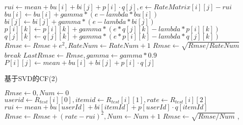 \documentclass[bachelor]{seuthesis} %
\begin{document}
\begin{Main}
\begin{algorithm}
\begin{algorithmic}[1]
                    \State $rui\gets mean+bu[i]+bi[j]+p[i]\cdot q[j],e\gets RateMatrix[i][j]-rui$
                    \State $bu[i]\gets bu[i]+gamma*(e-lambda*bu[i])$
                    \State $bi[j]\gets bi[j]+gamma*(e-lambda*bi[j])$
                        \State $p[i][k]\gets p[i][k]+gamma*(e*q[j][k]-lambda*p[i][k])$
                        \State $q[j][k]\gets q[j][k]+gamma*(e*p[i][k]-lambda*q[j][k])$
                    \EndFor
                    \State $Rmse\gets Rmse+e^2,RateNum\gets RateNum+1$
                \EndFor
            \EndFor
            \State $Rmse\gets\sqrt{Rmse/RateNum}$
                \State $break$
            \EndIf
            \State $LastRmse\gets Rmse,gamma\gets gamma*0.9$
        \EndFor
                    \State $P[i][j]\gets mean+bu[i]+bi[j]+p[i]\cdot q[j]$
                \EndFor
        \EndFor
        \State {}
        \EndFunction
    \end{algorithmic}
\end{algorithm}
\newpage
\begin{algorithm}
    \caption{基于SVD的CF(2)}
    \begin{algorithmic}[1] %
        \State $Rmse\gets0,Num\gets0$
            \State $userid\gets R_{test}[i][0],itemid\gets R_{test}[i][1],rate\gets R_{test}[i][2]$
            \State $rui\gets mean+bu[userId]+bi[itemId]+p[userId]\cdot q[itemId]$
            \State $Rmse\gets Rmse+(rate-rui)^2,Num\gets Num+1$
        \EndFor
        \State $Rmse\gets\sqrt{Rmse/Num}$
        \State {}
        \EndFunction
        \State {}
        \State {},
        \EndFunction
    \end{algorithmic}
\end{algorithm}

\end{Main}
\end{document}
